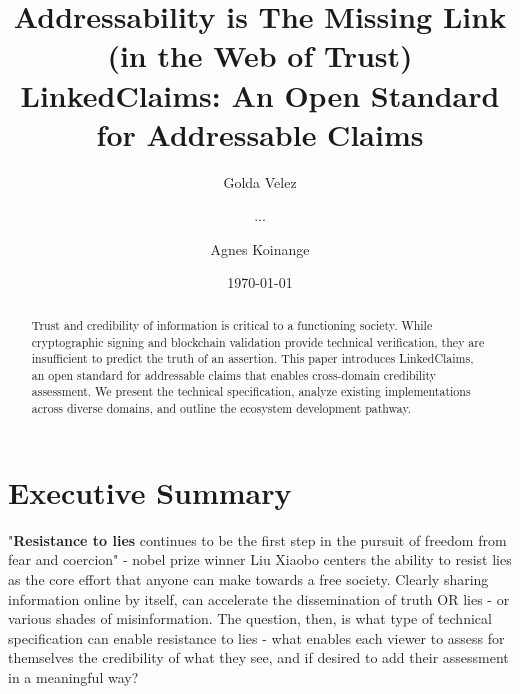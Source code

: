 \documentclass[11pt]{article}
\title{Addressability is The Missing Link (in the Web of Trust)\\[0.5em]\Large LinkedClaims: An Open Standard for Addressable Claims}
\author[1]{Golda Velez}
\author[2]{...}
\author[1]{Agnes Koinange}
\affil[1]{LinkedTrust}
\affil[2]{...}
\date{\today}
\begin{document}
\maketitle

\begin{abstract}
Trust and credibility of information is critical to a functioning society. While cryptographic signing and blockchain validation provide technical verification, they are insufficient to predict the truth of an assertion. This paper introduces LinkedClaims, an open standard for addressable claims that enables cross-domain credibility assessment. We present the technical specification, analyze existing implementations across diverse domains, and outline the ecosystem development pathway.
\end{abstract}

\section{Executive Summary}

"\textbf{Resistance to lies} continues to be the first step in the pursuit of freedom from fear and coercion"\cite{1} - nobel prize winner Liu Xiaobo centers the ability to resist lies as the core effort that anyone can make towards a free society.  Clearly sharing information online by itself, can accelerate the dissemination of truth OR lies - or various shades of misinformation.  The question, then, is what type of technical specification can enable resistance to lies - what enables each viewer to assess for themselves the credibility of what they see, and if desired to add their assessment in a meaningful way?  
\end{document}
